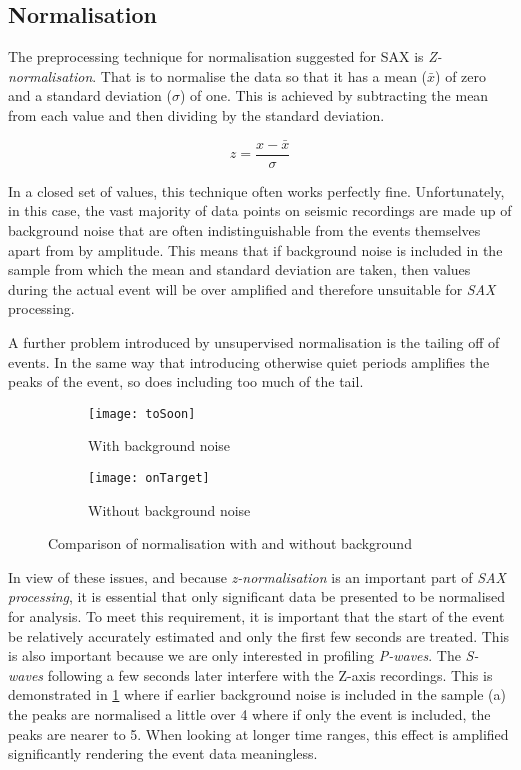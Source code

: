 \documentclass[../report.tex]{subfiles}
\begin{document}
	
\subsection{Normalisation} \label{sec:Z-normalisation}
	The preprocessing technique for normalisation suggested for SAX \citep{sax} is \textit{Z-normalisation}.  That is to normalise the data so that it has a mean ($\bar{x}$) of zero and a standard deviation ($\sigma$) of one.  This is achieved by subtracting the mean from each value and then dividing by the standard deviation.
	
	\begin{equation}
	z = \dfrac{x - \bar{x}}{\sigma}
	\end{equation}
	
	In a closed set of values, this technique often works perfectly fine.  Unfortunately, in this case, the vast majority of data points on seismic recordings are made up of background noise that are often indistinguishable from the events themselves apart from by amplitude.  This means that if background noise is included in the sample from which the mean and standard deviation are taken, then values during the actual event will be over amplified and therefore unsuitable for \textit{SAX} processing.
	
	A further problem introduced by unsupervised normalisation is the tailing off of events.  In the same way that introducing otherwise quiet periods amplifies the peaks of the event, so does including too much of the tail.
	
\begin{figure}[h]
	\begin{subfigure}{\textwidth}
		\centering
		\texttt{[image: toSoon]}
		\caption[]{With background noise}
	\end{subfigure}
	\begin{subfigure}{\textwidth}
		\centering
		\texttt{[image: onTarget]}
		\caption[]{Without background noise}
	\end{subfigure}
	\caption{Comparison of normalisation with and without background}
	\label{fig:tosoon}
\end{figure}

	In view of these issues, and because \textit{z-normalisation} is an important part of \textit{SAX processing}, it is essential that only significant data be presented to be normalised for analysis.  To meet this requirement, it is important that the start of the event be relatively accurately estimated and only the first few seconds are treated.  This is also important because we are only interested in profiling \textit{P-waves}. The \textit{S-waves} following a few seconds later interfere with the Z-axis recordings.  This is demonstrated in \cref{fig:tosoon} where if earlier background noise is included in the sample (a) the peaks are normalised a little over 4 where if only the event is included, the peaks are nearer to 5.  When looking at longer time ranges, this effect is amplified significantly rendering the event data meaningless.
\end{document}
